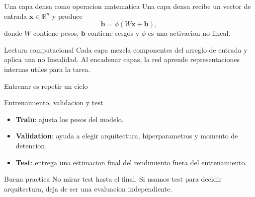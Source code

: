 \begin{frame}{Una capa densa como operacion matematica}
Una capa densa recibe un vector de entrada $\bm{x}\in\mathbb{R}^{n}$ y produce
\[
\bm{h}=\phi(W\bm{x}+\bm{b}),
\]
donde $W$ contiene pesos, $\bm{b}$ contiene sesgos y $\phi$ es una activacion no lineal.

\begin{block}{Lectura computacional}
Cada capa mezcla componentes del arreglo de entrada y aplica una no linealidad. Al encadenar capas, la red aprende representaciones internas utiles para la tarea.
\end{block}
\end{frame}

\begin{frame}{Entrenar es repetir un ciclo}
\centering
{}
\end{frame}

\begin{frame}{Entrenamiento, validacion y test}
\begin{itemize}
    \item \textbf{Train}: ajusta los pesos del modelo.
    \item \textbf{Validation}: ayuda a elegir arquitectura, hiperparametros y momento de detencion.
    \item \textbf{Test}: entrega una estimacion final del rendimiento fuera del entrenamiento.
\end{itemize}

\begin{alertblock}{Buena practica}
No mirar test hasta el final. Si usamos test para decidir arquitectura, deja de ser una evaluacion independiente.
\end{alertblock}
\end{frame}

